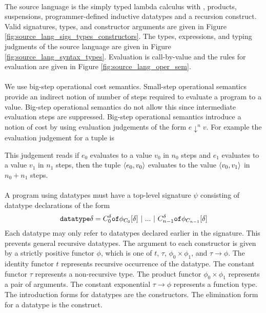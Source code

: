 \paragraph{}
The source language is the simply typed lambda calculus with ,
products, suspensions, programmer-defined inductive datatypes and a recursion
construct. Valid signatures, types, and constructor arguments are given in
Figure \ref{fig:source_lang_sigs_types_constructors}. The types, expressions,
and typing judgments of the source language are given in Figure
\ref{fig:source_lang_syntax_types}. Evaluation is call-by-value and the rules
for evaluation are given in Figure \ref{fig:source_lang_oper_sem}.

\paragraph{}
We use big-step operational cost semantics. Small-step operational semantics
provide an indirect notion of number of steps required to evaluate a program to
a value. Big-step operational semantics do not allow this since intermediate
evaluation steps are suppressed. Big-step operational semantics introduce a
notion of cost by using evaluation judgements of the form $e \downarrow^n v$.
For example the evaluation judgement for a tuple is
%
\begin{prooftree}
\end{prooftree}
%
This judgement reads if $e_0$ evaluates to a value $v_0$ in $n_0$ steps and
$e_1$ evaluates to a value $v_1$ in $n_1$ steps, then the tuple $\LP
e_0,v_0\RP$ evaluates to the value $\LP v_0,v_1\RP$ in $n_0+n_1$ steps.

\paragraph{}
A program using datatypes must have a top-level signature $\psi$ consisting of
datatype declarations of the form
%
\[ \T{datatype} \delta = C^\delta_0 \T{of} \phi_{C_0}[\delta] \ |\ ...\ |\ C^\delta_{n-1} \T{of} \phi_{C_{n-1}}[\delta] \]
%
Each datatype may only refer to datatypes declared earlier in the signature.
This prevents general recursive datatypes.  The argument to each constructor is
given by a strictly positive functor $\phi$, which is one of $t$, $\tau$,
$\phi_0 \times \phi_1$, and $\tau \rightarrow \phi$.  The identity functor $t$
represents recursive occurrence of the datatype.  The constant functor $\tau$
represents a non-recursive type.  The product functor $\phi_0 \times \phi_1$
represents a pair of arguments.  The constant exponential $\tau \rightarrow \phi$
represents a function type.  The introduction forms for datatypes are the
constructors.  The elimination form for a datatype is the  construct.

